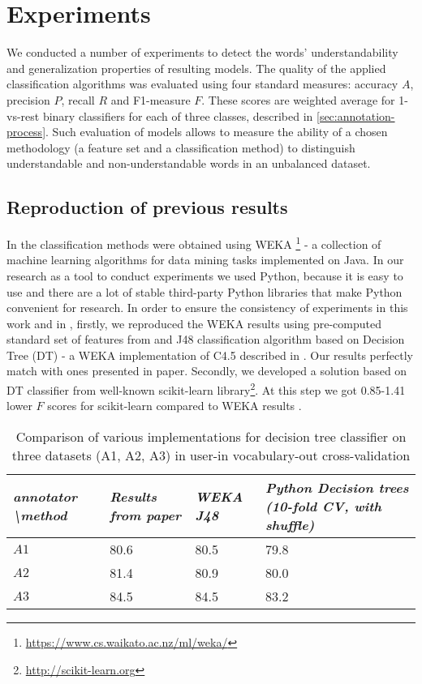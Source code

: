 \chapter{Experiments}
\label{ch:experiments}

We conducted a number of experiments to detect the words' understandability and generalization properties of resulting models. The quality of the applied classification algorithms was evaluated using four standard measures: accuracy $A$, precision $P$, recall $R$ and F1-measure $F$. These scores are weighted average for 1-vs-rest binary classifiers for each of three classes, described in \ref{sec:annotation-process}. Such evaluation of models allows to measure the ability of a chosen methodology (a feature set and a classification method) to distinguish understandable and non-understandable words in an unbalanced dataset. 

\section{Reproduction of previous results}

In \citep{Grabar-PITR2014} the classification methods were obtained using WEKA \footnote{\url{https://www.cs.waikato.ac.nz/ml/weka/}} - a collection of machine learning algorithms for data mining tasks implemented on Java. In our research as a tool to conduct experiments we used Python, because it is easy to use and there are a lot of stable third-party Python libraries that make Python convenient for research. In order to ensure the consistency of experiments in this work and in \citep{Grabar-PITR2014}, firstly, we reproduced the WEKA results using pre-computed standard set of features from \citep{Grabar-PITR2014} and J48 classification algorithm based on Decision Tree (DT) - a WEKA implementation of C4.5 described in \citep{Quinlan1993}. Our results perfectly match with ones presented in paper. Secondly, we developed a solution based on DT classifier from well-known scikit-learn library\footnote{\url{http://scikit-learn.org}}. At this step we got 0.85-1.41 lower $F$ scores for scikit-learn compared to WEKA results .

\begin{table}[h]
\begin{tabular}{L|LLL}
\hline
\textit{annotator \textbackslash method} & \textit{Results from paper \citep{Grabar-PITR2014}} & \textit{WEKA J48} & \textit{Python Decision trees (10-fold CV, with shuffle)} \\ \hline
$A1$ & 80.6 & 80.5 & 79.8 \\
$A2$ & 81.4 & 80.9 & 80.0 \\
$A3$ & 84.5 & 84.5 & 83.2 \\ \hline
\end{tabular}
\caption{Comparison of various implementations for decision tree classifier on three datasets (A1, A2, A3) in user-in vocabulary-out cross-validation}
\end{table}

